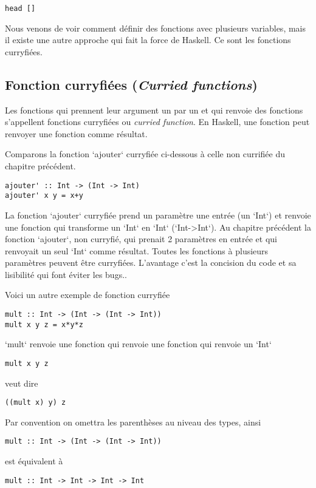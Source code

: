 \documentclass[11pt]{article}
\begin{document}
\begin{verbatim}
head []
\end{verbatim}

Nous venons de voir comment définir des fonctions avec plusieurs variables, mais il existe une autre approche qui fait la force de Haskell.  Ce sont les fonctions curryfiées.

\subsection{Fonction curryfiées (\emph{Curried functions})}
\label{sec:orga146d08}
Les fonctions qui prennent leur argument un par un et qui renvoie des fonctions s'appellent fonctions curryfiées ou \emph{curried function}.  En Haskell, une fonction peut renvoyer une fonction comme résultat.

Comparons la fonction `ajouter` curryfiée ci-dessous à celle non currifiée du chapitre précédent.
\begin{verbatim}
ajouter' :: Int -> (Int -> Int)
ajouter' x y = x+y
\end{verbatim}

La fonction `ajouter` curryfiée  prend un paramètre une entrée (un `Int`) et renvoie une fonction qui transforme un `Int` en `Int` (`Int->Int`).   Au chapitre précédent la fonction `ajouter`, non curryfié, qui prenait  2 paramètres en entrée et qui renvoyait un seul `Int` comme résultat.   Toutes les fonctions à plusieurs paramètres peuvent être curryfiées. L'avantage c'est la concision du code et sa lisibilité qui font éviter les bugs..

Voici un autre exemple de fonction curryfiée
\begin{verbatim}
mult :: Int -> (Int -> (Int -> Int))
mult x y z = x*y*z
\end{verbatim}
`mult` renvoie une fonction qui renvoie une fonction qui renvoie un `Int`

\begin{verbatim}
mult x y z
\end{verbatim}
veut  dire
\begin{verbatim}
((mult x) y) z
\end{verbatim}

Par convention on omettra les parenthèses au niveau des types, ainsi
\begin{verbatim}
mult :: Int -> (Int -> (Int -> Int))
\end{verbatim}
est équivalent à
\begin{verbatim}
mult :: Int -> Int -> Int -> Int
\end{verbatim}
\end{document}
